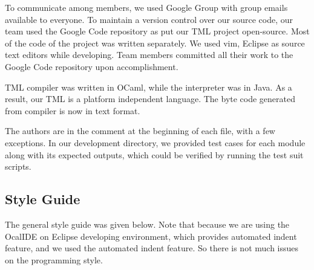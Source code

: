 \documentclass[12pt,psfig,a4]{article}
\begin{document}
To communicate among members, we used Google Group with group emails available to everyone. To maintain a version control over our source code, our team used the Google Code repository as put our TML project open-source. Most of the code of the project was written separately. We used vim, Eclipse as source text editors while developing. Team members committed all their work to the Google Code repository upon accomplishment.

TML compiler was written in OCaml, while the interpreter was in Java. As a result, our TML is a platform independent language. The byte code generated from compiler is now in text format. 

The authors are in the comment at the beginning of each file, with a few exceptions. In our development directory, we provided test cases for each module along with its expected outputs, which could be verified by running the test suit scripts.


\subsection{Style Guide}
The general style guide was given below. Note that because we are using the OcalIDE on Eclipse developing environment, which provides automated indent feature, and we used the automated indent feature. So there is not much issues on the programming style.
\end{document}
